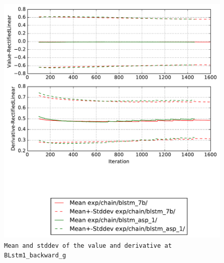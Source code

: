 \documentclass[prl,10pt,twocolumn]{revtex4}
\begin{document}
\newpage
\begin{figure}[h]
  \begin{center}
    \caption{\texttt{Mean and stddev of the value and derivative at BLstm1\_backward\_g}}
    \includegraphics[width=\textwidth]{exp/chain/blstm_7b/report/nonlinstats_BLstm1_backward_g.pdf}
  \end{center}
\end{figure}
\clearpage
\end{document}
